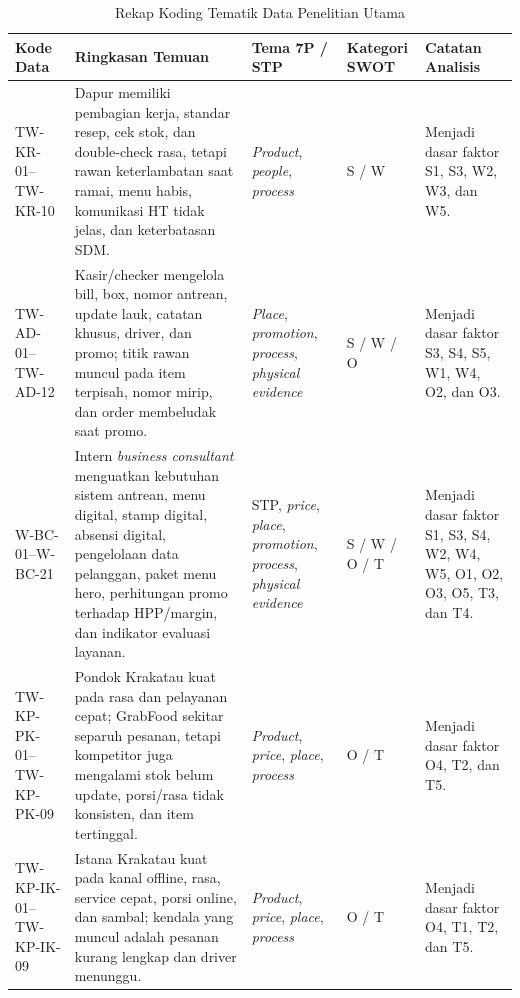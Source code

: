 \begin{table}[!htbp]
    \centering
    \caption{Rekap Koding Tematik Data Penelitian Utama}
    \label{tab:template-koding-tematik}
    \footnotesize
    \setlength{\tabcolsep}{3pt}
    \renewcommand{\arraystretch}{0.95}
    \begin{tabularx}{\textwidth}{|Z{1.8cm}|Y|Y|Y|Y|}
        \toprule
        \textbf{Kode Data} & \textbf{Ringkasan Temuan} & \textbf{Tema 7P / STP} & \textbf{Kategori SWOT} & \textbf{Catatan Analisis} \\ \hline
        \midrule
        TW-KR-01--TW-KR-10 & Dapur memiliki pembagian kerja, standar resep, cek stok, dan double-check rasa, tetapi rawan keterlambatan saat ramai, menu habis, komunikasi HT tidak jelas, dan keterbatasan SDM. & \textit{Product}, \textit{people}, \textit{process} & S / W & Menjadi dasar faktor S1, S3, W2, W3, dan W5. \\ \hline
        TW-AD-01--TW-AD-12 & Kasir/checker mengelola bill, box, nomor antrean, update lauk, catatan khusus, driver, dan promo; titik rawan muncul pada item terpisah, nomor mirip, dan order membeludak saat promo. & \textit{Place}, \textit{promotion}, \textit{process}, \textit{physical evidence} & S / W / O & Menjadi dasar faktor S3, S4, S5, W1, W4, O2, dan O3. \\ \hline
        W-BC-01--W-BC-21 & Intern \textit{business consultant} menguatkan kebutuhan sistem antrean, menu digital, stamp digital, absensi digital, pengelolaan data pelanggan, paket menu hero, perhitungan promo terhadap HPP/margin, dan indikator evaluasi layanan. & STP, \textit{price}, \textit{place}, \textit{promotion}, \textit{process}, \textit{physical evidence} & S / W / O / T & Menjadi dasar faktor S1, S3, S4, W2, W4, W5, O1, O2, O3, O5, T3, dan T4. \\ \hline
        TW-KP-PK-01--TW-KP-PK-09 & Pondok Krakatau kuat pada rasa dan pelayanan cepat; GrabFood sekitar separuh pesanan, tetapi kompetitor juga mengalami stok belum update, porsi/rasa tidak konsisten, dan item tertinggal. & \textit{Product}, \textit{price}, \textit{place}, \textit{process} & O / T & Menjadi dasar faktor O4, T2, dan T5. \\ \hline
        TW-KP-IK-01--TW-KP-IK-09 & Istana Krakatau kuat pada kanal offline, rasa, service cepat, porsi online, dan sambal; kendala yang muncul adalah pesanan kurang lengkap dan driver menunggu. & \textit{Product}, \textit{price}, \textit{place}, \textit{process} & O / T & Menjadi dasar faktor O4, T1, T2, dan T5. \\ \hline

\end{tabularx}
\end{table}
